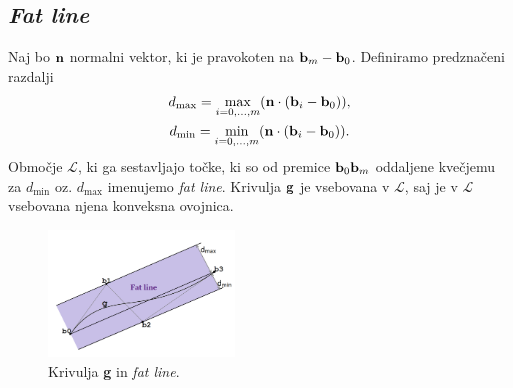 
\subsection{{\em Fat line}}
Naj bo ${\bf n}$ normalni vektor, ki je pravokoten na ${\bf b}_m - {\bf b}_0$. Definiramo predznačeni razdalji 
\begin{gather*}
d_{\text{max}} = \max _{i=0,\ldots ,m} ({\bf n}\cdot ({\bf b}_i - {\bf b}_0)),\\
d_{\text{min}} = \min _{i=0,\ldots ,m} ({\bf n}\cdot ({\bf b}_i - {\bf b}_0)).
\end{gather*}
Območje $\mathcal{L}$, ki ga sestavljajo točke, ki so od premice ${\bf b}_0{\bf b}_m$ oddaljene kvečjemu za $d_{\text{min}}$ oz. $d_{\text{max}}$ imenujemo {\em fat line}. Krivulja ${\bf g}$ je vsebovana v $\mathcal{L}$, saj je v $\mathcal{L}$ vsebovana njena konveksna ovojnica.
\begin{figure}[!h]
    \centering 
    \includegraphics[width=0.44\textwidth]{fat_line_color}
    \caption{Krivulja {\bf g} in {\em fat line}.}
  	\label{slika3}
\end{figure}